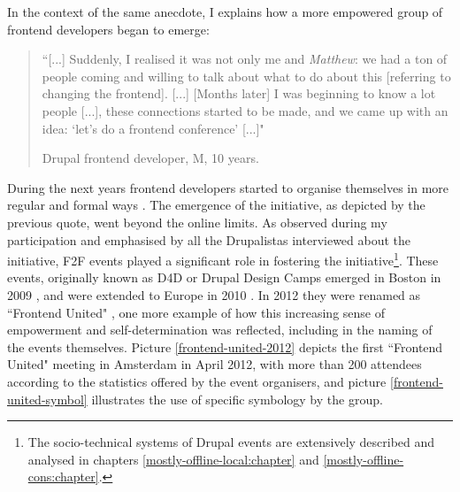 In the context of the same anecdote, I explains how a more empowered group of frontend developers began to emerge:

\begin{quotation}
``[...] Suddenly, I realised it was not only me and \textit{Matthew}: we had a ton of people coming and willing to talk about what to do about this [referring to changing the frontend]. [...] [Months later] I was beginning to know a lot people [...], these connections started to be made, and we came up with an idea: `let's do a frontend conference' [...]"
\begin{flushright}\footnotesize{Drupal frontend developer, M, 10 years.}\end{flushright}
\end{quotation}

During the next years frontend developers started to organise themselves in more regular and formal ways \parencite{d4dgroup:Online}. The emergence of the initiative, as depicted by the previous quote, went beyond the online limits. As observed during my participation and emphasised by all the Drupalistas interviewed about the initiative, F2F events played a significant role in fostering the initiative\footnote{The socio-technical systems of Drupal events are extensively described and analysed in chapters \ref{mostly-offline-local:chapter} and \ref{mostly-offline-cons:chapter}.}. These events, originally known as D4D or Drupal Design Camps emerged in Boston in 2009 \parencite{d4dcamp:Online}, and were extended to Europe in 2010 \parencite{d4dcamp_eur:Online}. In 2012 they were renamed as ``Frontend United" \parencite{fe_united:Online}, one more example of how this increasing sense of empowerment and self-determination was reflected, including in the naming of the events themselves. Picture \ref{frontend-united-2012} depicts the first ``Frontend United" meeting in Amsterdam in April 2012, with more than 200 attendees according to the statistics offered by the event organisers, and picture \ref{frontend-united-symbol} illustrates the use of specific symbology by the group.

